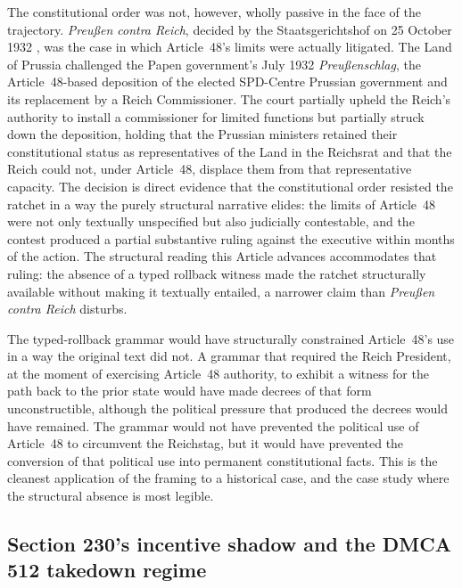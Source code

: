 The constitutional order was not, however, wholly passive in the face of the trajectory.
\emph{Preu{\ss}en contra Reich}, decided by the Staatsgerichtshof on 25 October 1932
\cite{ref_preussen_contra_reich_1932}, was the case in which Article~48's limits were actually
litigated.
The Land of Prussia challenged the Papen government's July 1932 \emph{Preu{\ss}enschlag}, the
Article~48-based deposition of the elected SPD-Centre Prussian government and its replacement by a Reich
Commissioner.
The court partially upheld the Reich's authority to install a commissioner for limited functions but
partially struck down the deposition, holding that the Prussian ministers retained their constitutional
status as representatives of the Land in the Reichsrat and that the Reich could not, under Article~48,
displace them from that representative capacity.
The decision is direct evidence that the constitutional order resisted the ratchet in a way the
purely structural narrative elides: the limits of Article~48 were not only textually unspecified but
also judicially contestable, and the contest produced a partial substantive ruling against the executive
within months of the action.
The structural reading this Article advances accommodates that ruling: the absence of a typed
rollback witness made the ratchet structurally available without making it textually entailed, a
narrower claim than \emph{Preu{\ss}en contra Reich} disturbs.

The typed-rollback grammar would have structurally constrained Article~48's use in a way the original
text did not.
A grammar that required the Reich President, at the moment of exercising Article~48 authority,
to exhibit a witness for the path back to the prior state would have made decrees of that form
unconstructible, although the political pressure that produced the decrees would have remained.
The grammar would not have prevented the political use of Article~48 to circumvent the Reichstag,
but it would have prevented the conversion of that political use into permanent constitutional facts.
This is the cleanest application of the framing to a historical case,
and the case study where the structural absence is most legible.

\subsection{Section 230's incentive shadow and the DMCA 512 takedown regime}
\label{sec:cases:section230}

